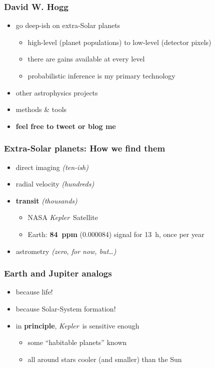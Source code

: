 \documentclass[aspectratio=169]{beamer}
\renewcommand{\emph}[1]{\textbf{#1}}
\newcommand{\project}[1]{\textsl{#1}}
\newcommand{\Kepler}{\project{Kepler}}
\begin{document}
\begin{frame}
  \frametitle{David W. Hogg}
  \begin{itemize}
  \item go deep-ish on extra-Solar planets
    \begin{itemize}
    \item high-level (planet populations) to low-level (detector pixels)
    \item there are gains available at every level
    \item probabilistic inference is my primary technology
    \end{itemize}
  \item other astrophysics projects
  \item methods \& tools
  \item \emph{feel free to tweet or blog me}
  \end{itemize}
\end{frame}

\begin{frame}
  \frametitle{Extra-Solar planets: How we find them}
  \begin{itemize}
  \item direct imaging \textit{(ten-ish)}
  \item radial velocity \textit{(hundreds)}
  \item \emph{transit} \textit{(thousands)}
    \begin{itemize}
    \item NASA \Kepler\ Satellite
    \item Earth: \emph{84~ppm} (0.000084) signal for 13~h, once per year
    \end{itemize}
  \item astrometry \textit{(zero, for now, but\ldots)}
  \end{itemize}
\end{frame}

\begin{frame}
  \frametitle{Earth and Jupiter analogs}
  \begin{itemize}
  \item because life!
  \item because Solar-System formation!
  \item in \emph{principle}, \Kepler\ is sensitive enough
    \begin{itemize}
    \item some ``habitable planets'' known
    \item all around stars cooler (and smaller) than the Sun
    \end{itemize}
  \end{itemize}
\end{frame}
\end{document}
